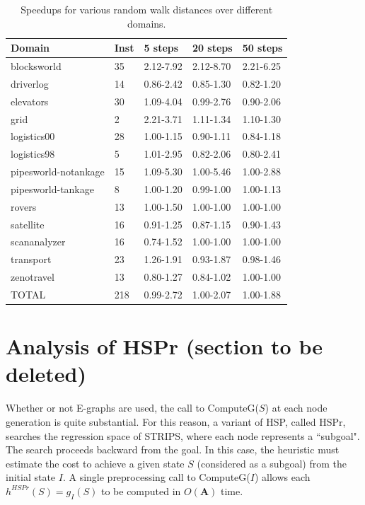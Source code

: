 \documentclass[letterpaper]{article}
\begin{document}
\begin{table}
	\begin{center}
	    \begin{tabular}{| l | l | l | l | l |}
	    \hline
	    Domain & Inst & 5 steps & 20 steps & 50 steps
	    \\ \hline
	    blocksworld & 35 & 2.12-7.92 & 2.12-8.70 & 2.21-6.25
	    \\ \hline
	    driverlog & 14 & 0.86-2.42 & 0.85-1.30 & 0.82-1.20
	    \\ \hline
	    elevators & 30 & 1.09-4.04 & 0.99-2.76 & 0.90-2.06
	    \\ \hline
	    grid & 2 & 2.21-3.71 & 1.11-1.34 & 1.10-1.30
	    \\ \hline
	    logistics00 & 28 & 1.00-1.15 & 0.90-1.11 & 0.84-1.18
	    \\ \hline
	    logistics98 & 5 & 1.01-2.95 & 0.82-2.06 & 0.80-2.41
	    \\ \hline
	    pipesworld-notankage & 15 & 1.09-5.30 & 1.00-5.46 & 1.00-2.88
	    \\ \hline
	    pipesworld-tankage & 8 & 1.00-1.20 & 0.99-1.00 & 1.00-1.13
	    \\ \hline
	    rovers & 13 & 1.00-1.50 & 1.00-1.00 & 1.00-1.00
	    \\ \hline
	    satellite & 16 & 0.91-1.25 & 0.87-1.15 & 0.90-1.43
	    \\ \hline
	    scananalyzer & 16 & 0.74-1.52 & 1.00-1.00 & 1.00-1.00
	    \\ \hline
	    transport & 23 & 1.26-1.91 & 0.93-1.87 & 0.98-1.46
	    \\ \hline
	    zenotravel & 13 & 0.80-1.27 & 0.84-1.02 & 1.00-1.00
	    \\ \hline
	    TOTAL & 218 & 0.99-2.72 & 1.00-2.07 & 1.00-1.88
	    \\ \hline
	    \end{tabular}
	\end{center}
	\caption{Speedups for various random walk distances over different domains.}
	 \label{tab:walk}
\end{table}

\section{Analysis of HSPr (section to be deleted)}

Whether or not E-graphs are used, the call to ComputeG($S$) at each node generation is quite substantial. For this reason, a variant of HSP, called HSPr, searches the regression space of STRIPS, where each node represents a ``subgoal". The search proceeds backward from the goal. In this case, the heuristic must estimate the cost to achieve a given state $S$ (considered as a subgoal) from the initial state $I$. A single preprocessing call to ComputeG($I$) allows each $h^{HSPr}(S) = g_I(S)$ to be computed in $O(\mathbf{A})$ time.
\end{document}
